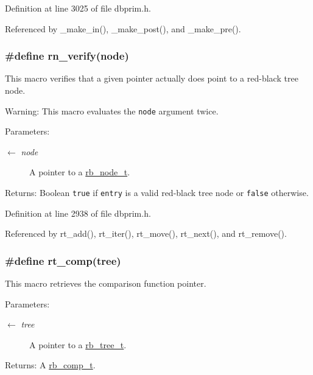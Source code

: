Definition at line 3025 of file dbprim.h.

Referenced by \_\-make\_\-in(), \_\-make\_\-post(), and \_\-make\_\-pre().\hypertarget{group__dbprim__rbtree_ga31}{
\subsubsection[rn\_\-verify]{\setlength{\rightskip}{0pt plus 5cm}\#define rn\_\-verify(node)}}
\label{group__dbprim__rbtree_ga31}


This macro verifies that a given pointer actually does point to a red-black tree node.

\begin{Desc}
\item[Warning:]This macro evaluates the {\tt node} argument twice.\end{Desc}
\begin{Desc}
\item[Parameters:]
\begin{description}
\item[\mbox{$\leftarrow$} {\em node}]A pointer to a \hyperlink{group__dbprim__rbtree_ga1}{rb\_\-node\_\-t}.\end{description}
\end{Desc}
\begin{Desc}
\item[Returns:]Boolean {\tt true} if {\tt entry} is a valid red-black tree node or {\tt false} otherwise.\end{Desc}


Definition at line 2938 of file dbprim.h.

Referenced by rt\_\-add(), rt\_\-iter(), rt\_\-move(), rt\_\-next(), and rt\_\-remove().\hypertarget{group__dbprim__rbtree_ga22}{
\subsubsection[rt\_\-comp]{\setlength{\rightskip}{0pt plus 5cm}\#define rt\_\-comp(tree)}}
\label{group__dbprim__rbtree_ga22}


This macro retrieves the comparison function pointer.

\begin{Desc}
\item[Parameters:]
\begin{description}
\item[\mbox{$\leftarrow$} {\em tree}]A pointer to a \hyperlink{group__dbprim__rbtree_ga0}{rb\_\-tree\_\-t}.\end{description}
\end{Desc}
\begin{Desc}
\item[Returns:]A \hyperlink{group__dbprim__rbtree_ga3}{rb\_\-comp\_\-t}.\end{Desc}


